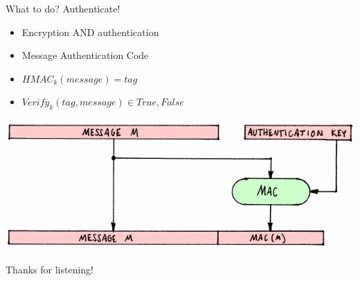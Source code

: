 \documentclass[10pt, compress]{beamer}
\begin{document}
\begin{frame}{What to do? Authenticate!}
\begin{itemize}
        \item Encryption AND authentication
        \item Message Authentication Code
        \item \( HMAC_k(message) = tag \)
        \item \( Verify_k(tag, message) \in {True, False} \)
      \end{itemize}
\includegraphics[width=\textwidth]{images/HashFig2.png} \\
\end{frame}


\begin{frame}[standout]
Thanks for listening!
\end{frame}
\end{document}
